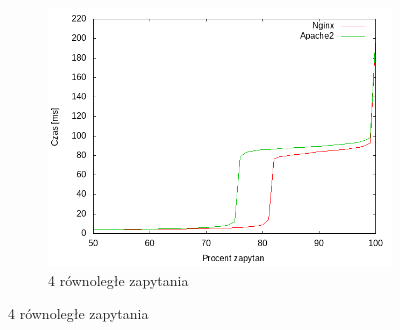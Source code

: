 \begin{figure}
\begin{subfigure}[h]{0.3\textwidth}
		\includegraphics[width=\textwidth]{testy/wybor_fib_15_4.png}
		\caption{4 równoległe zapytania}
	\end{subfigure}


\end{figure}
